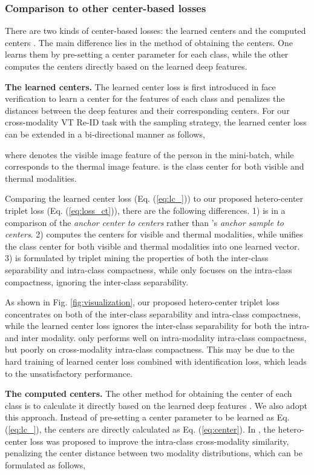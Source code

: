 \documentclass[journal]{IEEEtran}
\begin{document}
\subsubsection{Comparison to other center-based losses}
There are two kinds of center-based losses: the learned centers \cite{Wen2016ADF,tifs19vtreid} and the computed centers \cite{zhu2019hetero}. The main difference lies in the method of obtaining the centers. One learns them by pre-setting a center parameter for each class, while the other computes the centers directly based on the learned deep features.

 \textbf{The learned centers.} The learned center loss \cite{Wen2016ADF} is first introduced in face verification to learn a center for the features of each class and penalizes the distances between the deep features and their corresponding centers. For our cross-modality VT Re-ID task with the  sampling strategy, the learned center loss can be extended in a bi-directional manner \cite{liu2020enhancing,tifs19vtreid,ye2018visible} as follows,

where  denotes the  visible image feature of the  person in the mini-batch, while  corresponds to the thermal image feature.  is the  class center for both visible and thermal modalities.

Comparing the learned center loss  (Eq. (\ref{eq:lc_})) to our proposed hetero-center triplet loss  (Eq. (\ref{eq:loss_ct})), there are the following differences.
1)  is in a comparison of the \emph{anchor center to centers} rather than 's \emph{anchor sample to centers}.
2)  computes the centers for visible and thermal modalities, while  unifies the  class center for both visible and thermal modalities into one learned vector.
3)  is formulated by triplet mining the properties of both the inter-class separability and intra-class compactness, while  only focuses on the intra-class compactness, ignoring the inter-class separability.

As shown in Fig. \ref{fig:visualization}, our proposed hetero-center triplet loss  concentrates on both of the inter-class separability and intra-class compactness, while the learned center loss  ignores the inter-class separability for both the intra- and inter modality.
 only performs well on intra-modality intra-class compactness, but poorly on cross-modality intra-class compactness. This may be due to the hard training of learned center loss combined with identification loss, which leads to the unsatisfactory performance.

\textbf{The computed centers.} The other method for obtaining the center of each class is to calculate it directly based on the learned deep features \cite{zhu2019hetero}. We also adopt this approach. Instead of pre-setting a center parameter to be learned as Eq. (\ref{eq:lc_}), the centers are directly calculated as Eq. (\ref{eq:center}).
In \cite{zhu2019hetero}, the hetero-center loss  was proposed to improve the intra-class cross-modality similarity, penalizing the center distance between two modality distributions, which can be formulated as follows,
\end{document}
